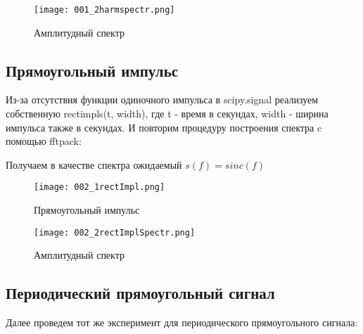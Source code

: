 \begin{figure}[H]
	\begin{center}
		\texttt{[image: 001\_2harmspectr.png]}
		\caption{Амплитудный спектр} 
		\label{pic:pic02} %
	\end{center}
\end{figure} 

\subsection{Прямоугольный импульс}

Из-за отсутствия функции одиночного импульса в scipy.signal реализуем
собственную rectimpls(t, width), где t - время в секундах, width - 
ширина импульса также в секундах. И повторим 
процедуру построения спектра c помощью fftpack: 


\parindent=1cm %

Получаем в качестве спектра ожидаемый $s(f) = sinc(f)$ 

\begin{figure}[H]
	\begin{center}
		\texttt{[image: 002\_1rectImpl.png]}
		\caption{Прямоугольный импульс} 
		\label{pic:pic03} %
	\end{center}
\end{figure} 

\begin{figure}[H]
	\begin{center}
		\texttt{[image: 002\_2rectImplSpectr.png]}
		\caption{Амплитудный спектр} 
		\label{pic:pic04} %
	\end{center}
\end{figure} 

\subsection{Периодический прямоугольный сигнал}
Далее проведем тот же эксперимент для периодического прямоугольного сигнала:


\parindent=1cm %

